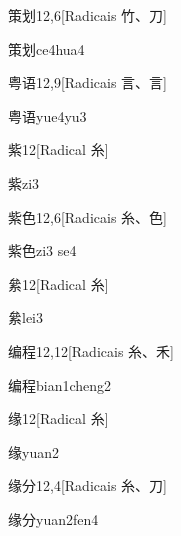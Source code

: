 \begin{entry}{策划}{12,6}[Radicais ⽵、⼑]
  \begin{phonetics}{策划}{ce4hua4}
  \end{phonetics}
\end{entry}

\begin{entry}{粤语}{12,9}[Radicais ⾔、⾔]
  \begin{phonetics}{粤语}{yue4yu3}
  \end{phonetics}
\end{entry}

\begin{entry}{紫}{12}[Radical ⽷]
  \begin{phonetics}{紫}{zi3}
  \end{phonetics}
\end{entry}

\begin{entry}{紫色}{12,6}[Radicais ⽷、⾊]
  \begin{phonetics}{紫色}{zi3 se4}
  \end{phonetics}
\end{entry}

\begin{entry}{絫}{12}[Radical ⽷]
  \begin{phonetics}{絫}{lei3}
  \end{phonetics}
\end{entry}

\begin{entry}{编程}{12,12}[Radicais ⽷、⽲]
  \begin{phonetics}{编程}{bian1cheng2}
  \end{phonetics}
\end{entry}

\begin{entry}{缘}{12}[Radical ⽷]
  \begin{phonetics}{缘}{yuan2}
  \end{phonetics}
\end{entry}

\begin{entry}{缘分}{12,4}[Radicais ⽷、⼑]
  \begin{phonetics}{缘分}{yuan2fen4}
  \end{phonetics}
\end{entry}

